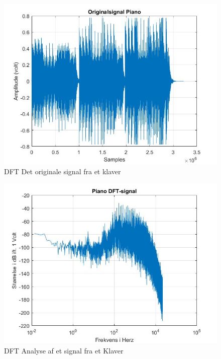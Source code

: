 \begin{figure}[H]
	\centering
	\includegraphics[width=180mm]{figures/Piano/original.jpg}
	\caption{DFT Det originale signal fra et klaver}
	\label{fig:Klaver original}
\end{figure}

\begin{figure}[H]
	\centering
	\includegraphics[width=180mm]{figures/Piano/DFT.jpg}
	\caption{DFT Analyse af et signal fra et Klaver}
	\label{fig:Klaver DFT}
\end{figure}

